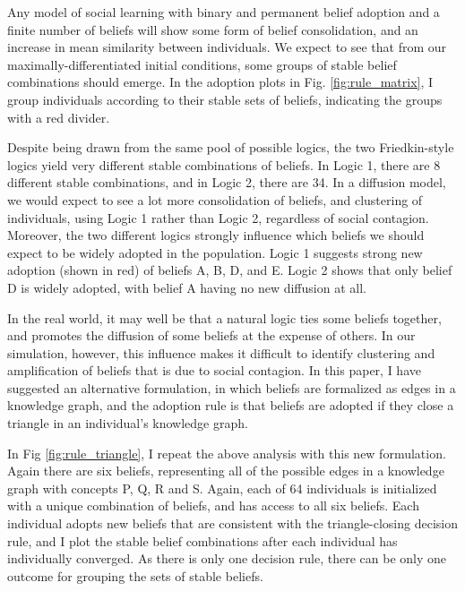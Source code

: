 \documentclass{article}
\begin{document}
Any model of social learning with binary and permanent belief adoption and a finite number of beliefs will show some form of belief consolidation, and an increase in mean similarity between individuals. We expect to see that from our maximally-differentiated initial conditions, some groups of stable belief combinations should emerge. In the adoption plots in Fig. \ref{fig:rule_matrix}, I group individuals according to their stable sets of beliefs, indicating the groups with a red divider.

Despite being drawn from the same pool of possible logics, the two Friedkin-style logics yield very different stable combinations of beliefs. In Logic 1, there are 8 different stable combinations, and in Logic 2, there are 34. In a diffusion model, we would expect to see a lot more consolidation of beliefs, and clustering of individuals, using Logic 1 rather than Logic 2, regardless of social contagion. Moreover, the two different logics strongly influence which beliefs we should expect to be widely adopted in the population. Logic 1 suggests strong new adoption (shown in red) of beliefs A, B, D, and E. Logic 2 shows that only belief D is widely adopted, with belief A having no new diffusion at all.

In the real world, it may well be that a natural logic ties some beliefs together, and promotes the diffusion of some beliefs at the expense of others. In our simulation, however, this influence makes it difficult to identify clustering and amplification of beliefs that is due to social contagion. In this paper, I have suggested an alternative formulation, in which beliefs are formalized as edges in a knowledge graph, and the adoption rule is that beliefs are adopted if they close a triangle in an individual’s knowledge graph.

In Fig \ref{fig:rule_triangle}, I repeat the above analysis with this new formulation. Again there are six beliefs, representing all of the possible edges in a knowledge graph with concepts P, Q, R and S. Again, each of 64 individuals is initialized with a unique combination of beliefs, and has access to all six beliefs. Each individual adopts new beliefs that are consistent with the triangle-closing decision rule, and I plot the stable belief combinations after each individual has individually converged. As there is only one decision rule, there can be only one outcome for grouping the sets of stable beliefs.  
\end{document}
